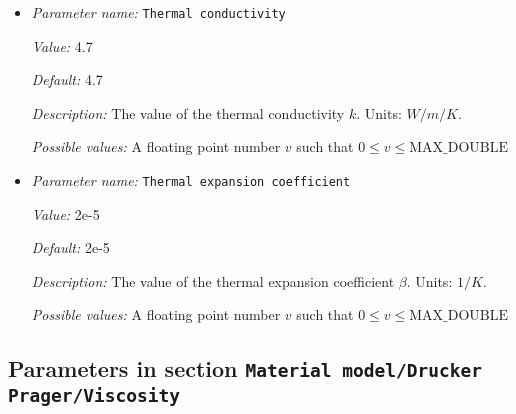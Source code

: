 \begin{itemize}
{\it Value:} 1e22


{\it Default:} 1e22


{\it Description:} The value of the reference viscosity $\eta_0$. Units: $kg/m/s$.


{\it Possible values:} A floating point number $v$ such that $0 \leq v \leq \text{MAX\_DOUBLE}$
\item {\it Parameter name:} {\tt Thermal conductivity}
\label{parameters:Material model/Drucker Prager/Thermal conductivity}


{\it Value:} 4.7


{\it Default:} 4.7


{\it Description:} The value of the thermal conductivity $k$. Units: $W/m/K$.


{\it Possible values:} A floating point number $v$ such that $0 \leq v \leq \text{MAX\_DOUBLE}$
\item {\it Parameter name:} {\tt Thermal expansion coefficient}
\label{parameters:Material model/Drucker Prager/Thermal expansion coefficient}


{\it Value:} 2e-5


{\it Default:} 2e-5


{\it Description:} The value of the thermal expansion coefficient $\beta$. Units: $1/K$.


{\it Possible values:} A floating point number $v$ such that $0 \leq v \leq \text{MAX\_DOUBLE}$
\end{itemize}



\subsection{Parameters in section \tt Material model/Drucker Prager/Viscosity}
\label{parameters:Material_20model/Drucker_20Prager/Viscosity}

